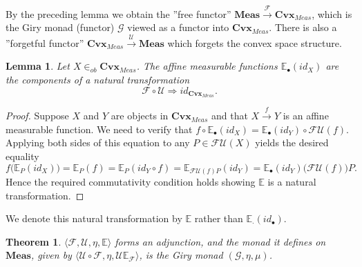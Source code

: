 \documentclass[10pt,a4paper]{amsart}
\newtheorem{theorem}{Theorem}
\newtheorem{lemma}{Lemma}
\newcommand{\be}{\begin{equation}}
\newcommand{\ee}{\end{equation}}
\newcommand{\G}{\mathcal{G}}
\begin{document}
By the preceding lemma we obtain  the ''free functor'' $\mathbf{Meas} \xrightarrow{\mathcal{F}} \mathbf{Cvx}_{Meas}$, which is the Giry monad (functor) $\G$ viewed as a functor into $\mathbf{Cvx}_{Meas}$. There is also a ''forgetful functor'' $\mathbf{Cvx}_{Meas}  \xrightarrow{\mathcal{U}} \mathbf{Meas}$ which forgets the convex space structure.  

\begin{lemma} Let $X \in_{ob} \mathbf{Cvx}_{Meas}$.  The affine measurable functions $\mathbb{E}_{\bullet}(id_X)$ are the components of a  natural transformation
\be \nonumber
\mathcal{F} \circ \mathcal{U} \Rightarrow id_{\mathbf{Cvx}_{Meas}}.
\ee
\end{lemma}
\begin{proof}
Suppose $X$ and $Y$ are objects in $\mathbf{Cvx}_{Meas}$ and that $X \xrightarrow{f} Y$ is an affine measurable function.  We need to verify that $f \circ \mathbb{E}_{\bullet}(id_X) = \mathbb{E}_{\bullet}(id_Y) \circ \mathcal{F}\mathcal{U}(f)$.  Applying both sides of this equation to any $P \in \mathcal{F}\mathcal{U}(X)$ yields the desired equality
$$
 f\big(\mathbb{E}_{P}(id_X)\big) = \mathbb{E}_{P}(f) = \mathbb{E}_P(id_Y \circ f)=\mathbb{E}_{\mathcal{F}\mathcal{U}(f)P}(id_Y)=\mathbb{E}_{\bullet}(id_Y)\big(\mathcal{F}\mathcal{U} (f)\big)P.
$$
Hence the required commutativity condition holds showing $\mathbb{E}$ is a natural transformation. 

\end{proof}
We denote this natural transformation by $\mathbb{E}$ rather than $\mathbb{E}_{\cdot}(id_{\bullet})$.

\begin{theorem}  $\langle \mathcal{F}, \mathcal{U}, \eta, \mathbb{E} \rangle$ forms an adjunction, and  the  monad it defines on $\mathbf{Meas}$, given by $\langle \mathcal{U} \circ \mathcal{F}, \eta, \mathcal{U}\mathbb{E}_{\mathcal{F}} \rangle$,   is the Giry monad  $(\G, \eta, \mu)$.
\end{theorem}
\end{document}
